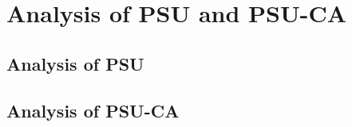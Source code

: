 \section{Analysis of PSU and PSU-CA}

\subsection{Analysis of PSU}\label{sec:psu-attack}


\subsection{Analysis of PSU-CA}\label{sec:psu-ca-attack}